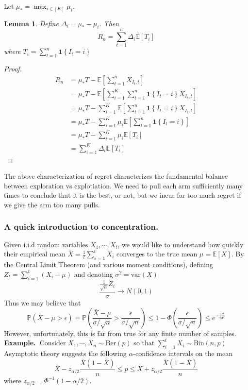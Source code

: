 \documentclass[11pt]{article}
\newtheorem{lemma}{Lemma}
\newcommand{\example}{\noindent\textbf{Example.\  }}
\renewcommand{\P}{\mathbb{P}}
\newcommand{\E}{\mathbb{E}}
\newcommand{\var}{\text{var}}
\newcommand{\1}[1]{\mathbf{1}\left\{#1\right\}}
\begin{document}
Let $\mu_{\ast} = \max_{i\in [K]} \mu_i$. 
\begin{lemma}
    Define $\Delta_i = \mu_{\ast} - \mu_i$. Then
    \[R_n = \sum_{t=1}^n\Delta_i\E[T_i]\]
    where $T_i = \sum_{t=1}^n \1{I_t = i}$
\end{lemma}
\begin{proof}
    \begin{align*}
        R_n 
        &= \mu_{\ast} T - \E\left[\sum_{t=1}^n X_{I_t, t}\right]\\
        &= \mu_{\ast} T - \E\left[\sum_{i=1}^{K}\sum_{t=1}^n \1{I_t = i} X_{I_t, t}\right]\\
        &= \mu_{\ast} T - \sum_{i=1}^{K}\E\left[\sum_{t=1}^n \1{I_t = i} X_{I_t, t}\right]\\
        &= \mu_{\ast} T - \sum_{i=1}^{K}\mu_i\E\left[\sum_{t=1}^n \1{I_t = i} \right]\\
        &=  \mu_{\ast} T - \sum_{i=1}^{K}\mu_i\E[T_i]\\
        &= \sum_{i=1}^K \Delta_i \E[T_i]
    \end{align*}
\end{proof}
The above characterization of regret characterizes the fundamental balance between exploration vs explotiation. We need to pull each arm sufficiently many times to conclude that it is the best, or not, but we incur far too much regret if we give the arm too many pulls.

\subsubsection{A quick introduction to concentration.}
Given i.i.d random variables $X_1, \cdots, X_t$, we would like to understand how quickly their empirical mean $\bar{X} = \frac{1}{t}\sum_{s=1}^t X_i$ converges to the true mean $\mu = \E[X]$. By the Central Limit Theorem (and various moment conditions), defining $Z_t = \sum_{i=1}^t (X_i -\mu)$ and denoting $\sigma^2 = \var(X)$
\[\frac{\frac{1}{\sqrt{n}}Z_t}{\sigma} \rightarrow N(0,1)\]
Thus we may believe that 
\[\P(\bar{X} - \mu > \epsilon)  = \P(\frac{\bar{X} - \mu}{\sigma/\sqrt{n}} > \frac{\epsilon}{\sigma/\sqrt{n}}) \leq 1-\Phi(\frac{\epsilon}{\sigma/\sqrt{n}}) \leq e^{-\frac{n\epsilon^2}{2\sigma^2}}\]
However, unfortunately, this is far from true for any finite number of samples. \\

\example  Consider $X_1, \cdots, X_n \sim \text{Ber}(p)$ so that $\sum_{i=1}^t X_i \sim \text{Bin}(n,p)$ Asymptotic theory suggests the following $\alpha$-confidence intervals on the mean
\[\bar{X} - z_{\alpha/2}\frac{\bar{X}(1-\bar{X})}{n}\leq p \leq \bar{X} + z_{\alpha/2}\frac{\bar{X}(1-\bar{X})}{n}\]
where $z_{\alpha/2} = \Phi^{-1}(1-\alpha/2)$.
\end{document}
